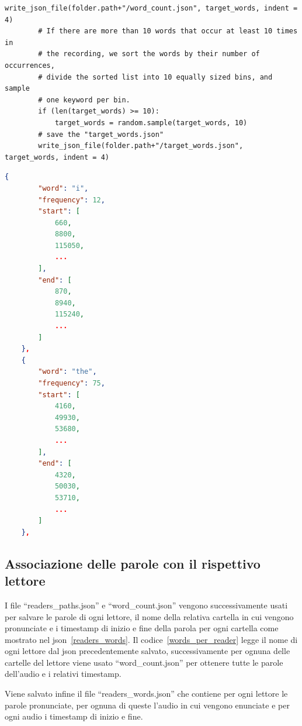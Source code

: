 \documentclass[12pt,a4paper,titlepage]{article}
\begin{document}
\begin{lstlisting}[language=iPython,firstnumber=1, caption=find\_target\_words.py, label=find_target_words,captionpos=b]
        write_json_file(folder.path+"/word_count.json", target_words, indent = 4)
        # If there are more than 10 words that occur at least 10 times in
        # the recording, we sort the words by their number of occurrences,
        # divide the sorted list into 10 equally sized bins, and sample 
        # one keyword per bin.
        if (len(target_words) >= 10):
            target_words = random.sample(target_words, 10)
        # save the "target_words.json"
        write_json_file(folder.path+"/target_words.json", target_words, indent = 4)

\end{lstlisting}

\begin{lstlisting}[language=json,firstnumber=1, caption=Formato del file word\_count.json, label=word_count,captionpos=b]
{
        "word": "i",
        "frequency": 12,
        "start": [
            660,
            8800,
            115050,
            ...
        ],
        "end": [
            870,
            8940,
            115240,
            ...
        ]
    },
    {
        "word": "the",
        "frequency": 75,
        "start": [
            4160,
            49930,
            53680,
            ...
        ],
        "end": [
            4320,
            50030,
            53710,
			...
   		]                
    },
\end{lstlisting}


\subsection{Associazione delle parole con il rispettivo lettore}
\label{subsec:unione}
I file ``readers\_paths.json'' e ``word\_count.json'' vengono successivamente usati per salvare le parole di ogni lettore, il nome della relativa cartella in cui vengono pronunciate e i timestamp di inizio e fine della parola per ogni cartella come mostrato nel json~\ref{readers_words}. Il codice~\ref{words_per_reader} legge il nome di ogni lettore dal json precedentemente salvato, successivamente per ognuna delle cartelle del lettore viene usato ``word\_count.json'' per ottenere tutte le parole dell'audio e i relativi timestamp.

Viene salvato infine il file ``readers\_words.json'' che contiene per ogni lettore le parole pronunciate, per ognuna di queste l'audio in cui vengono enunciate e per ogni audio i timestamp di inizio e fine.
\end{document}
